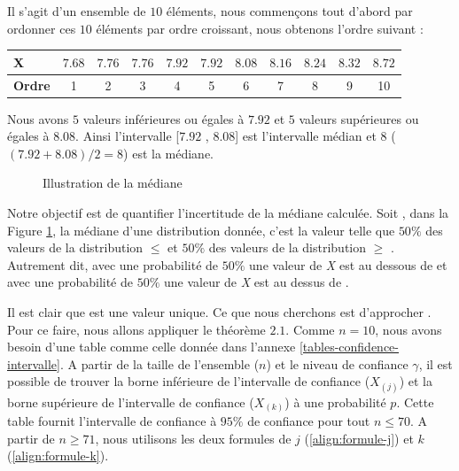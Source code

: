 Il s'agit d'un ensemble de $10$ éléments, nous commençons tout d'abord par ordonner ces $10$ éléments  par ordre croissant, nous obtenons l'ordre suivant :

\begin{table}[H]
	\centering
	\begin{tabular}{lccccc!{\color{red}\vrule}ccccc}
		\textbf{X}&	$ 7.68 $& $ 7.76 $& $ 7.76 $& $ 7.92 $& $ 7.92 $& $ 8.08  $& $ 8.16 $& $ 8.24 $& $ 8.32 $& $ 8.72 $\\ \hline
		\textbf{Ordre}&	1&2&3&4&5&6&7&8&9&10\\
	\end{tabular}
\end{table}

Nous avons $5$ valeurs inférieures ou égales à  $7.92$ et $5$ valeurs supérieures ou égales à $ 8.08 $. Ainsi l'intervalle [$ 7.92 $ , $ 8.08 $] est l'intervalle médian
et   $8$ ( $(7.92 + 8.08)/2 = 8 $) est la médiane.
\begin{figure}
	\captionsetup{justification=centering}
	
	\resizebox{.4\textwidth}{!}{
		
		
	}
	\caption{Illustration de la médiane}\label{fig:medianIllustration}
\end{figure} 

Notre objectif est de quantifier  l'incertitude de la médiane calculée.
Soit \textmu, dans la Figure \ref{fig:medianIllustration},  la médiane d'une distribution donnée, c'est la valeur telle que $50\%$ des valeurs de la distribution $\leq$ {\textmu}  et $50\%$ des valeurs de la distribution $\geq$  \textmu. Autrement dit, avec une probabilité de $50\%$ une valeur de \textit{X} est au dessous de {\textmu}  et avec une probabilité de $50\%$ une valeur de \textit{X} est au dessus de \textmu.


Il est clair que {\textmu} est une valeur unique. Ce que nous cherchons est d'approcher {\textmu}. Pour ce faire, nous allons appliquer le théorème $ 2.1 $. Comme $n = 10 $, nous avons besoin d'une table comme celle  donnée dans l'annexe \ref{tables-confidence-intervalle}. A partir de la taille de l'ensemble ($n$) et le niveau de confiance $\gamma$, il est possible de trouver la borne inférieure de l'intervalle de confiance ($X_{(j)}$) et la borne supérieure de l'intervalle de confiance ($X_{(k)}$) à une probabilité $p$. Cette table fournit l'intervalle de confiance à $95 \%$ de confiance pour tout $n \leq 70$. A partir de $n \geq 71$, nous utilisons les deux formules de $ j $ (\ref{align:formule-j}) et $ k $ (\ref{align:formule-k}).

